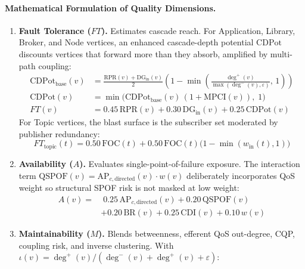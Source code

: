 \paragraph{Mathematical Formulation of Quality Dimensions.}
\begin{enumerate}
    \item \textbf{Fault Tolerance ($FT$).} Estimates cascade reach. For Application, Library, Broker, and Node vertices, an enhanced cascade-depth potential $\mathrm{CDPot}$ discounts vertices that forward more than they absorb, amplified by multi-path coupling:
    \begin{equation}
    \begin{aligned}
    \mathrm{CDPot}_{\text{base}}(v) &= \frac{\mathrm{RPR}(v) + \mathrm{DG}_{\text{in}}(v)}{2}\left(1 - \min\!\left(\frac{\deg^{+}(v)}{\max(\deg^{-}(v),\varepsilon)},\, 1\right)\right) \\
    \mathrm{CDPot}(v) &= \min\!\big(\mathrm{CDPot}_{\text{base}}(v)\,(1 + \mathrm{MPCI}(v)),\; 1\big) \\
    FT(v) &= 0.45\,\mathrm{RPR}(v) + 0.30\,\mathrm{DG}_{\text{in}}(v) + 0.25\,\mathrm{CDPot}(v)
    \end{aligned}
    \end{equation}
    For Topic vertices, the blast surface is the subscriber set moderated by publisher redundancy:
    \begin{equation}
    FT_{\text{topic}}(t) = 0.50\,\mathrm{FOC}(t) + 0.50\,\mathrm{FOC}(t)\big(1 - \min(w_{\text{in}}(t), 1)\big)
    \end{equation}
    \item \textbf{Availability ($A$).} Evaluates single-point-of-failure exposure. The interaction term $\mathrm{QSPOF}(v) = \mathrm{AP}_{c,\text{directed}}(v)\cdot w(v)$ deliberately incorporates QoS weight so structural SPOF risk is not masked at low weight:
    \begin{equation}
    \begin{aligned}
    A(v) = & \; 0.25\,\mathrm{AP}_{c,\text{directed}}(v) + 0.20\,\mathrm{QSPOF}(v) \\
           & + 0.20\,\mathrm{BR}(v) + 0.25\,\mathrm{CDI}(v) + 0.10\,w(v)
    \end{aligned}
    \end{equation}
    \item \textbf{Maintainability ($M$).} Blends betweenness, efferent QoS out-degree, CQP, coupling risk, and inverse clustering. With $\iota(v) = \deg^{+}(v) / (\deg^{-}(v) + \deg^{+}(v) + \varepsilon)$:

\end{enumerate}
